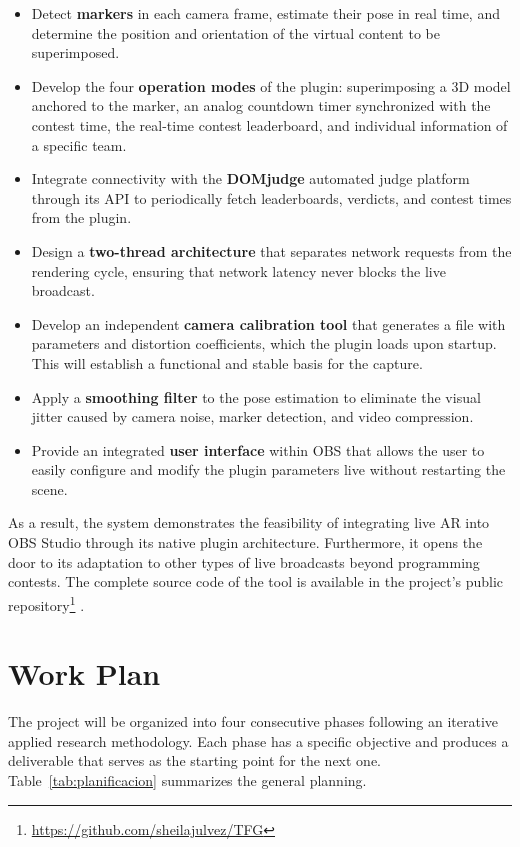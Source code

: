     \begin{itemize}
      \item Detect \textbf{markers} in each camera frame, estimate their pose in real time, and determine the position and orientation of the virtual content to be superimposed.
      \item Develop the four \textbf{operation modes} of the plugin: superimposing a 3D model anchored to the marker, an analog countdown timer synchronized with the contest time, the real-time contest leaderboard, and individual information of a specific team.
      \item Integrate connectivity with the \textbf{DOMjudge} automated judge platform through its API to periodically fetch leaderboards, verdicts, and contest times from the plugin.
      \item Design a \textbf{two-thread architecture} that separates network requests from the rendering cycle, ensuring that network latency never blocks the live broadcast.
      \item Develop an independent \textbf{camera calibration tool} that generates a file with parameters and distortion coefficients, which the plugin loads upon startup. This will establish a functional and stable basis for the capture.
      \item Apply a \textbf{smoothing filter} to the pose estimation to eliminate the visual jitter caused by camera noise, marker detection, and video compression.
      \item Provide an integrated \textbf{user interface} within OBS that allows the user to easily configure and modify the plugin parameters live without restarting the scene.
    \end{itemize}

As a result, the system demonstrates the feasibility of integrating live AR into OBS Studio through its native plugin architecture. Furthermore, it opens the door to its adaptation to other types of live broadcasts beyond programming contests. The complete source code of the tool is available in the project's public repository\footnote{\url{https://github.com/sheilajulvez/TFG}} \citep{PluginRepo}.

\section{Work Plan}

The project will be organized into four consecutive phases following an iterative applied research methodology. Each phase has a specific objective and produces a deliverable that serves as the starting point for the next one. Table~\ref{tab:planificacion} summarizes the general planning.

